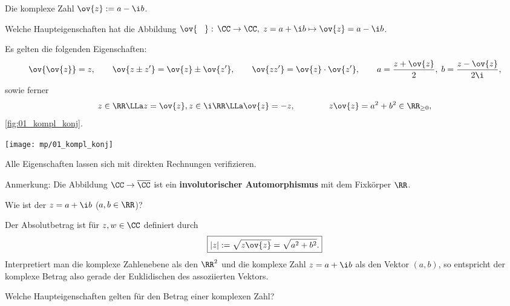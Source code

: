 \begin{antwort}
  Die komplexe Zahl $\ov{z}:=a-\i b$. 
  \AntEnd
\end{antwort}






\begin{frage}
  Welche Haupteigenschaften hat die Abbildung 
  $\ov{\rule{3mm}{0mm} \rule{0mm}{1.5mm}}:\,\CC \to \CC, \; 
  z=a+\i b \mapsto \ov{z}=a-\i b$.
\end{frage}


\begin{antwort}
  Es gelten die folgenden Eigenschaften:
  \[
  \ov{\ov{z}}=z, \qquad \ov{z\pm z'} = \ov{z} \pm \ov{z'}, \qquad  
  \ov{zz'}=\ov{z}\cdot \ov{z'}, \qquad 
  a=\frac{z+\ov{z}}{2},\;b=\frac{z-\ov{z}}{2\i},
  \]
  sowie ferner
  \[
  z \in \RR \LLa z=\ov{z}, z\in \i\RR \LLa \ov{z}=-z,
  \qquad\qquad z\ov{z}=a^2+b^2 \in \RR_{\ge 0},
  \]
  \sieheAbbildung\ref{fig:01_kompl_konj}.
  \begin{center}
    \texttt{[image: mp/01\_kompl\_konj]}
    \label{fig:01_kompl_konj}
  \end{center}
  Alle Eigenschaften lassen sich mit direkten Rechnungen verifizieren. 

  Anmerkung: Die Abbildung $\CC\to\overline{\CC}$ ist ein 
  \textbf{involutorischer Automorphismus} mit dem 
  Fixkörper $\RR$. 
  \AntEnd
\end{antwort}






\begin{frage}
  Wie ist der  
  $z=a+\i b$ ($a,b\in\RR$)? 
\end{frage}

\begin{antwort}
  Der Absolutbetrag ist für $z,w\in\CC$ definiert durch 
  \[
  \boxed{
    |z|:= \sqrt{z\ov{z}} = \sqrt{a^2+b^2}.}
  \]
  Interpretiert man die komplexe Zahlenebene als den $\RR^2$ und die 
  komplexe Zahl $z=a+\i b$ als den Vektor $(a,b)$, 
  so entspricht der komplexe Betrag also gerade der Euklidischen 
  des assoziierten Vektors. \AntEnd 
\end{antwort} 



\begin{frage}\label{01_komplexbetrag}
  Welche Haupteigenschaften gelten für den Betrag einer komplexen Zahl?
\end{frage}

